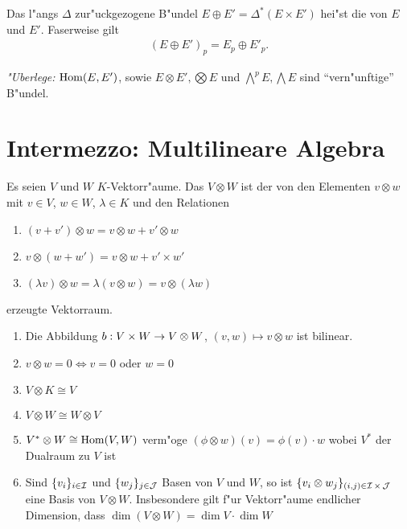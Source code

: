 \begin{center}\end{center}

Das l"angs $\Delta$ zur"uckgezogene B"undel $E \oplus E' = \Delta^{\ast}(E \times E')$ hei"st die  von $E$ und $E'$.
Faserweise gilt
\begin{align*}
  (E \oplus E')_p = E_p \oplus E'_p.
\end{align*}
 
\emph{"Uberlege:} $\operatorname{Hom}(E,E')$, sowie $E \otimes E', \bigotimes E$ und $\bigwedge^pE, \bigwedge E$ sind "`vern"unftige"' B"undel.


\section{Intermezzo: Multilineare Algebra}

Es seien $V$ und $W$ $K$-Vektorr"aume. Das  $V \otimes W$ ist der von den Elementen $v \otimes w$ mit $v \in V$, $w \in W$, $\lambda \in K$ und den Relationen
\begin{enumerate}[label=(\roman*),widest=iii]
\item
	$(v + v') \otimes w = v \otimes w + v' \otimes w$
\item
	$v \otimes (w + w') = v \otimes w + v' \times w'$
\item
	$(\lambda v) \otimes w = \lambda (v \otimes w) = v \otimes (\lambda w)$
\end{enumerate} erzeugte Vektorraum.

\begin{emptythm}[Eigenschaften:]
\begin{enumerate}[label=(\arabic*),leftmargin=*]
\item Die Abbildung $b: V \times W \to V \otimes W$, $(v, w) \mapsto v \otimes w$ ist bilinear.
\item $v \otimes w = 0 \Leftrightarrow v = 0$ oder $w = 0$
\item $V \otimes K \cong V$
\item $V \otimes W \cong W \otimes V$
\item $V^* \otimes W \cong \operatorname{Hom}(V, W)$ verm"oge $(\phi \otimes w)(v) = \phi(v) \cdot w$ wobei $V^*$ der \gls{Dualraum} zu $V$ ist
\item Sind $\{v_i\}_{i \in \operatorname{\mathcal{I}}}$ und $\{w_j\}_{j \in \operatorname{\mathcal{J}}}$ Basen von $V$ und $W$, so ist $\{v_i \otimes w_j\}_{(i,j) \in \operatorname{\mathcal{I}} \times \operatorname{\mathcal{J}}}$ eine Basis von $V \otimes W$. Insbesondere gilt f"ur Vektorr"aume endlicher Dimension, dass $\dim (V \otimes W) = \dim V \cdot \dim W$
\end{enumerate}
\end{emptythm}

